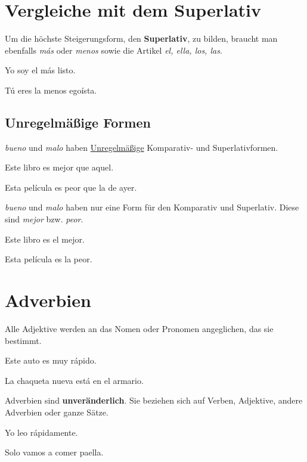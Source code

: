 \section{Vergleiche mit dem Superlativ}
Um die höchste Steigerungsform, den \textbf{Superlativ}, zu 
bilden, braucht man ebenfalls \textit{m\'as} oder \textit{menos}
sowie die Artikel \textit{el, ella, los, las}.
\begin{ejemplos}
    \item Yo soy el m\'as listo.
    \item T\'u eres la menos ego\'ista. 
\end{ejemplos}
\subsection*{Unregelmäßige Formen}
\textit{bueno} und \textit{malo} haben \underline{Unregelmäßige}
Komparativ- und Superlativformen.
\begin{ejemplos}
    \item Este libro es mejor que aquel.
    \item Esta pel\'icula es peor que la de ayer.
\end{ejemplos}
\textit{bueno} und \textit{malo} haben nur eine Form für
den Komparativ und Superlativ. Diese sind \textit{mejor} bzw.
\textit{peor}.
\begin{ejemplos}
    \item Este libro es el mejor.
    \item Esta pel\'icula es la peor.
\end{ejemplos}
\section{Adverbien}
Alle Adjektive werden an das Nomen oder Pronomen angeglichen,
das sie bestimmt.
\begin{ejemplos}
    \item Este auto es muy r\'apido.
    \item La chaqueta nueva est\'a en el armario.
\end{ejemplos}
Adverbien sind \textbf{unveränderlich}. Sie beziehen sich
auf Verben, Adjektive, andere Adverbien oder ganze Sätze.
\begin{ejemplos}
    \item Yo leo r\'apidamente.
    \item Solo vamos a comer paella.
\end{ejemplos}
